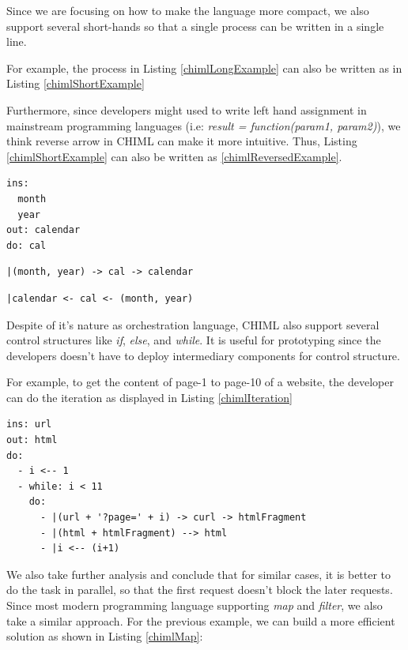 \documentclass[conference]{IEEEtran}
\begin{document}
Since we are focusing on how to make the language more compact, we also support several short-hands so that a single process can be written in a single line.

For example, the process in Listing \ref{chimlLongExample} can also be written as in Listing \ref{chimlShortExample}

Furthermore, since developers might used to write left hand assignment in mainstream programming languages (i.e: {\it result = function(param1, param2)}), we think reverse arrow in CHIML can make it more intuitive. Thus, Listing \ref{chimlShortExample} can also be written as \ref{chimlReversedExample}.

\begin{lstlisting}[caption=CHIML Program Example, label=chimlLongExample, basicstyle=\footnotesize, breaklines=true]
ins:
  month
  year
out: calendar
do: cal
\end{lstlisting}

\begin{lstlisting}[caption=CHIML Program Example (Short), label=chimlShortExample, basicstyle=\footnotesize, breaklines=true]
|(month, year) -> cal -> calendar
\end{lstlisting}

\begin{lstlisting}[caption=CHIML Program Example (Short-Reversed), label=chimlReversedExample, basicstyle=\footnotesize, breaklines=true]
|calendar <- cal <- (month, year)
\end{lstlisting}

Despite of it's nature as orchestration language, CHIML also support several control structures like {\it if}, {\it else}, and {\it while}. It is useful for prototyping since the developers doesn't have to deploy intermediary components for control structure.

For example, to get the content of page-1 to page-10 of a website, the developer can do the iteration as displayed in Listing \ref{chimlIteration}

\begin{lstlisting}[caption=CHIML Iteration, label=chimlIteration, basicstyle=\footnotesize, breaklines=true]
ins: url
out: html
do:
  - i <-- 1
  - while: i < 11
    do:
      - |(url + '?page=' + i) -> curl -> htmlFragment
      - |(html + htmlFragment) --> html
      - |i <-- (i+1)
\end{lstlisting}

We also take further analysis and conclude that for similar cases, it is better to do the task in parallel, so that the first request doesn't block the later requests. Since most modern programming language supporting {\it map} and {\it filter}, we also take a similar approach. For the previous example, we can build a more efficient solution as shown in Listing \ref{chimlMap}:
\end{document}
